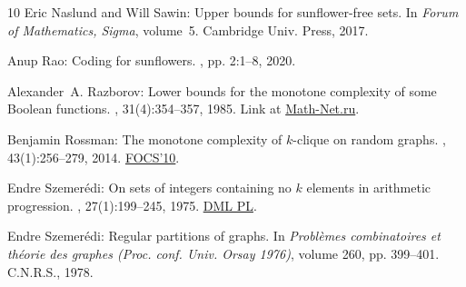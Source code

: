 \documentclass[11pt]{article}
\numberwithin{equation}{section}
\theoremstyle{definition}
\theoremstyle{plain}
\begin{document}
\begin{thebibliography}{10}
{\sc Eric Naslund and Will Sawin}: Upper bounds for sunflower-free sets.
\newblock In {\em Forum of Mathematics, Sigma}, volume~5. Cambridge Univ.
  Press, 2017.

{\sc Anup Rao}: Coding for sunflowers.
, pp. 2:1--8, 2020.

{\sc Alexander~A. Razborov}: Lower bounds for the monotone complexity of some
  {B}oolean functions.
, 31(4):354--357, 1985.
\newblock Link at
  \href{http://www.mathnet.ru/php/archive.phtml?wshow=paper&jrnid=dan&paperid=9192&option_lang=eng}{Math-Net.ru}.

{\sc Benjamin Rossman}: The monotone complexity of $k$-clique on random graphs.
, 43(1):256--279, 2014.
\newblock \prelim \href{https://doi.org/10.1109/FOCS.2010.26}{FOCS'10}.
\newblock [\epfmtdoi{10.1137/110839059}]

{\sc Endre Szemer\'{e}di}: On sets of integers containing no $k$ elements in
  arithmetic progression.
, 27(1):199--245, 1975.
\newblock \href{http://matwbn.icm.edu.pl/ksiazki/aa/aa27/aa27132.pdf}{DML PL}.

{\sc Endre Szemer\'{e}di}: Regular partitions of graphs.
\newblock In {\em Probl\`{e}mes combinatoires et th\'{e}orie des graphes (Proc.
  conf. Univ. Orsay 1976)}, volume 260, pp. 399--401. C.N.R.S., 1978.

\end{thebibliography}
\end{document}
